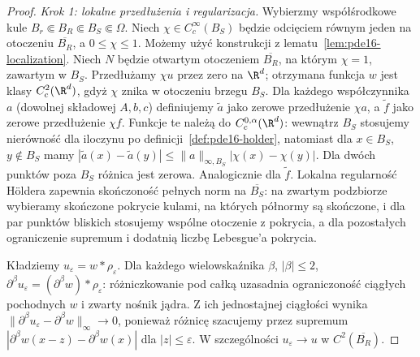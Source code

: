 \begin{proof}
\emph{Krok 1: lokalne przedłużenia i regularizacja.}
Wybierzmy współśrodkowe kule
$B_r\Subset B_R\Subset B_S\Subset\Omega$.
Niech $\chi\in C_c^\infty(B_S)$ będzie odcięciem
równym jeden na otoczeniu $\overline{B_R}$,
a $0\le\chi\le1$. Możemy użyć konstrukcji
z lematu~\ref{lem:pde16-localization}.
Niech $N$ będzie otwartym otoczeniem $\overline{B_R}$,
na którym $\chi=1$, zawartym w $B_S$.
Przedłużamy $\chi u$ przez zero na $\R^d$;
otrzymana funkcja $w$ jest klasy $C_c^2(\R^d)$,
gdyż $\chi$ znika w otoczeniu brzegu $B_S$.
Dla każdego współczynnika $a$ (dowolnej składowej $A,b,c$)
definiujemy $\widetilde a$ jako zerowe przedłużenie
$\chi a$, a $\widetilde f$ jako zerowe przedłużenie $\chi f$.
Funkcje te należą do $C_c^{0,\alpha}(\R^d)$:
wewnątrz $B_S$ stosujemy nierówność dla iloczynu
po definicji~\ref{def:pde16-holder}, natomiast
dla $x\in B_S$, $y\notin B_S$ mamy
$|\widetilde a(x)-\widetilde a(y)|
\le\|a\|_{\infty,B_S}|\chi(x)-\chi(y)|$.
Dla dwóch punktów poza $B_S$ różnica jest zerowa.
Analogicznie dla $\widetilde f$.
Lokalna regularność Höldera zapewnia skończoność
pełnych norm na $\overline{B_S}$: na zwartym
podzbiorze wybieramy skończone pokrycie kulami,
na których półnormy są skończone, i dla par punktów
bliskich stosujemy wspólne otoczenie z pokrycia,
a dla pozostałych ograniczenie supremum i dodatnią
liczbę Lebesgue'a pokrycia.

Kładziemy $u_\varepsilon=w*\rho_\varepsilon$.
Dla każdego wielowskaźnika $\beta$, $|\beta|\le2$,
$\partial^\beta u_\varepsilon
=(\partial^\beta w)*\rho_\varepsilon$:
różniczkowanie pod całką uzasadnia ograniczoność
ciągłych pochodnych $w$ i zwarty nośnik jądra.
Z ich jednostajnej ciągłości wynika
$\|\partial^\beta u_\varepsilon-\partial^\beta w\|_\infty
\to0$, ponieważ różnicę szacujemy przez supremum
$|\partial^\beta w(x-z)-\partial^\beta w(x)|$
dla $|z|\le\varepsilon$.
W szczególności $u_\varepsilon\to u$
w $C^2(\overline{B_R})$.


\end{proof}
